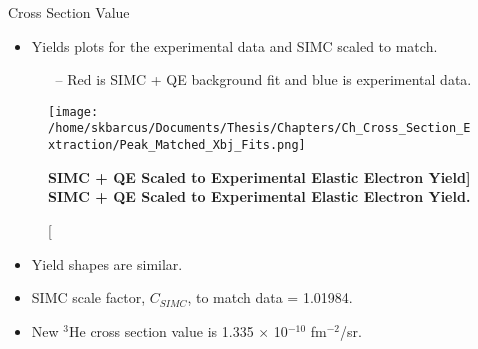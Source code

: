 \documentclass[10pt]{beamer}
\begin{document}
\begin{frame}[fragile]{Cross Section Value}

	\begin{itemize}
		\item Yields plots for the experimental data and SIMC scaled to match.
			\begin{itemize}
				\item[--]  \alert{Red} is \alert{SIMC + QE background fit} and  \alert{blue} is \alert{experimental data}. 
			\end{itemize}
	\end{itemize}
	
	\vspace{-3mm}
	\begin{figure}[!ht]
	\begin{center}
	\texttt{[image: /home/skbarcus/Documents/Thesis/Chapters/Ch\_Cross\_Section\_Extraction/Peak\_Matched\_Xbj\_Fits.png]}
	\end{center}
	\caption[\bf{SIMC + QE Scaled to Experimental Elastic Electron Yield}]		{
	{\bf{SIMC + QE Scaled to Experimental Elastic Electron Yield.}} }
	\label{fig:final_xs}
	\end{figure}
	
	\vspace{-5mm}
	\pause
	\begin{itemize}
		\item Yield shapes are similar. %
		\item {}\alert{SIMC scale factor}, $C_{SIMC}$, to match data \alert{= 1.01984}.
		\item New $^3$He \alert{cross section value is 1.335 $\times$ 10$^{-10}$ fm$^{-2}$/sr}. 
	\end{itemize}

\end{frame}
\end{document}
